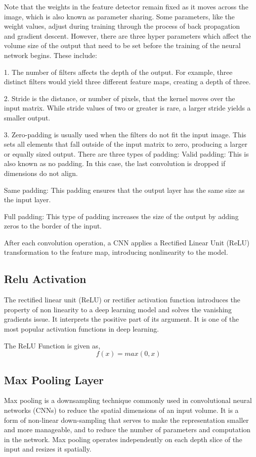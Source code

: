 Note that the weights in the feature detector remain fixed as it moves across the image, which is also known as parameter sharing. Some parameters, like the weight values, adjust during training through the process of back propagation and gradient descent. However, there are three hyper parameters which affect the volume size of the output that need to be set before the training of the neural network begins. These include:

1. The number of filters affects the depth of the output. For example, three distinct filters would yield three different feature maps, creating a depth of three. 

2. Stride is the distance, or number of pixels, that the kernel moves over the input matrix. While stride values of two or greater is rare, a larger stride yields a smaller output.

3. Zero-padding is usually used when the filters do not fit the input image. This sets all elements that fall outside of the input matrix to zero, producing a larger or equally sized output. There are three types of padding:
         Valid padding: This is also known as no padding. In this case, the last convolution is dropped if dimensions do not align.
    
         Same padding: This padding ensures that the output layer has the same size as the input layer.
    
         Full padding: This type of padding increases the size of the output by adding zeros to the border of the input.

After each convolution operation, a CNN applies a Rectified Linear Unit (ReLU) transformation to the feature map, introducing nonlinearity to the model.

\subsection{Relu Activation}
The rectified linear unit (ReLU) or rectifier activation function introduces the property of non linearity to a deep learning model and solves the vanishing gradients issue. It interprets the positive part of its argument. It is one of the most popular activation functions in deep learning.

The ReLU Function is given as, \[f(x) = max(0,x)\]

\subsection{Max Pooling Layer}
Max pooling is a downsampling technique commonly used in convolutional neural networks (CNNs) to reduce the spatial dimensions of an input volume. It is a form of non-linear down-sampling that serves to make the representation smaller and more manageable, and to reduce the number of parameters and computation in the network. Max pooling operates independently on each depth slice of the input and resizes it spatially.

